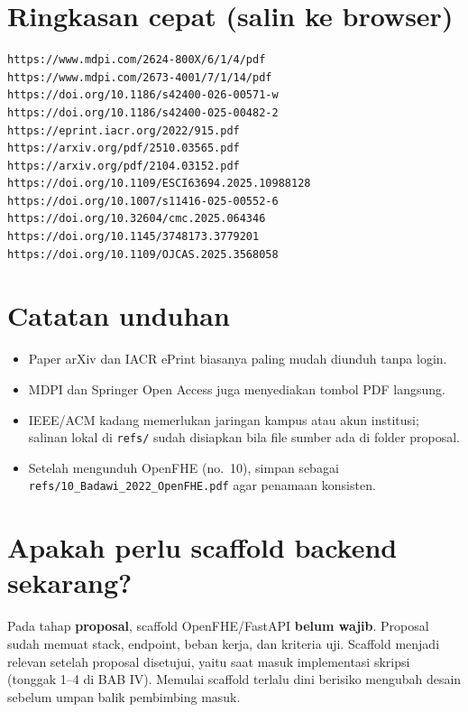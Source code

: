 \documentclass[11pt,a4paper]{article}
\begin{document}
\section{Ringkasan cepat (salin ke browser)}

\begin{verbatim}
https://www.mdpi.com/2624-800X/6/1/4/pdf
https://www.mdpi.com/2673-4001/7/1/14/pdf
https://doi.org/10.1186/s42400-026-00571-w
https://doi.org/10.1186/s42400-025-00482-2
https://eprint.iacr.org/2022/915.pdf
https://arxiv.org/pdf/2510.03565.pdf
https://arxiv.org/pdf/2104.03152.pdf
https://doi.org/10.1109/ESCI63694.2025.10988128
https://doi.org/10.1007/s11416-025-00552-6
https://doi.org/10.32604/cmc.2025.064346
https://doi.org/10.1145/3748173.3779201
https://doi.org/10.1109/OJCAS.2025.3568058
\end{verbatim}

\section{Catatan unduhan}
\begin{itemize}[leftmargin=1.2em]
  \item Paper arXiv dan IACR ePrint biasanya paling mudah diunduh tanpa login.
  \item MDPI dan Springer Open Access juga menyediakan tombol PDF langsung.
  \item IEEE/ACM kadang memerlukan jaringan kampus atau akun institusi; salinan lokal di \texttt{refs/} sudah disiapkan bila file sumber ada di folder proposal.
  \item Setelah mengunduh OpenFHE (no.\ 10), simpan sebagai \texttt{refs/10\_Badawi\_2022\_OpenFHE.pdf} agar penamaan konsisten.
\end{itemize}

\section{Apakah perlu scaffold backend sekarang?}
Pada tahap \textbf{proposal}, scaffold OpenFHE/FastAPI \textbf{belum wajib}. Proposal sudah memuat stack, endpoint, beban kerja, dan kriteria uji. Scaffold menjadi relevan setelah proposal disetujui, yaitu saat masuk implementasi skripsi (tonggak 1--4 di BAB IV). Memulai scaffold terlalu dini berisiko mengubah desain sebelum umpan balik pembimbing masuk.
\end{document}
